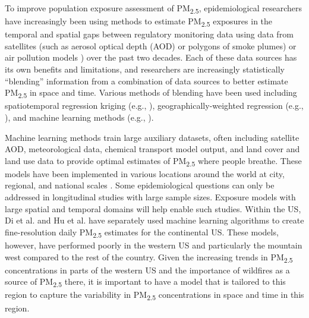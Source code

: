 \documentclass[english]{article}
\begin{document}
To improve population exposure assessment of PM\textsubscript{2.5}, epidemiological researchers have increasingly been using methods to estimate PM\textsubscript{2.5} exposures in the temporal and spatial gaps between regulatory monitoring data using data from satellites (such as aerosol optical depth (AOD) or polygons of smoke plumes) or air pollution models \cite{brokamp_assessing_2019, LIU2015120}) over the past two decades. Each of these data sources has its own benefits and limitations, and researchers are increasingly statistically “blending” information from a combination of data sources to better estimate PM\textsubscript{2.5} in space and time. Various methods of blending have been used including spatiotemporal regression kriging (e.g., \cite{hu_satellite-based_2019}), geographically-weighted regression (e.g., \cite{lassman_spatial_2017}), and machine learning methods (e.g., \cite{reid_spatiotemporal_2015, hu_estimating_2017, di_assessing_2016}). 

Machine learning methods train large auxiliary datasets, often including satellite %
AOD, meteorological data, chemical transport model output, and land cover and land use data to provide optimal estimates of PM\textsubscript{2.5} where people breathe. These models have been implemented in various locations around the world at city, regional, and national scales \cite{bellinger_systematic_2017}. Some epidemiological questions can only be addressed in longitudinal studies with large sample sizes. Exposure models with large spatial and temporal domains will help enable such studies. Within the US, Di et al. \cite{di_assessing_2016, di_ensemble-based_2019} and Hu et al. \cite{hu_estimating_2017} have separately used machine learning algorithms to create fine-resolution daily PM\textsubscript{2.5} estimates for the continental US. These models, however, have performed poorly in the western US  \cite{di_assessing_2016,hu_estimating_2017} and particularly the mountain west \cite{di_ensemble-based_2019} compared to the rest of the country. 
Given the increasing trends in PM\textsubscript{2.5} concentrations in parts of the western US and the importance of wildfires as a source of PM\textsubscript{2.5} there, it is important to have a model that is tailored to this region to capture the variability in PM\textsubscript{2.5} concentrations in space and time in this region.
\end{document}
